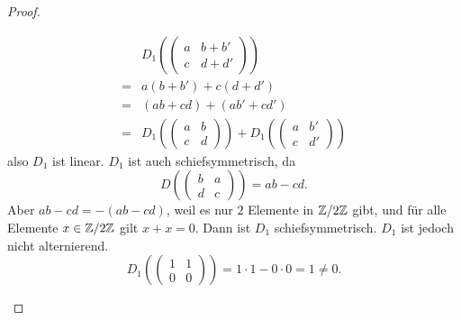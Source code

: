 \begin{proof}
\begin{parts}
\begin{align*}
			&D_1\left( \begin{pmatrix} a & b+b' \\ c & d+d' \end{pmatrix}  \right)\\
		=&a(b+b')+c(d+d')\\
		=&(ab+cd)+(ab'+cd')\\
		=&D_1\left( \begin{pmatrix} a & b \\ c & d \end{pmatrix} \right) +D_1\left( \begin{pmatrix} a & b' \\ c & d' \end{pmatrix}  \right)
		\end{align*}
		also $D_1$ ist linear. $D_1$ ist auch schiefsymmetrisch, da
		\[
			D\left( \begin{pmatrix} b & a \\ d & c \end{pmatrix} \right) =ab-cd
		.\]
		Aber $ab-cd=-(ab-cd)$, weil es nur $2$ Elemente in $\mathbb{Z} / 2\mathbb{Z}$ gibt, und f\"{u}r alle Elemente $x\in \mathbb{Z} / 2\mathbb{Z}$ gilt $x+x=0$. Dann ist $D_1$ schiefsymmetrisch. $D_1$ ist jedoch nicht alternierend. 
		\[
			D_1\left( \begin{pmatrix} 1 & 1 \\ 0 & 0 \end{pmatrix}  \right) =1\cdot 1-0\cdot 0 =1\neq 0
		.\] 
	\end{parts}
\end{proof}
